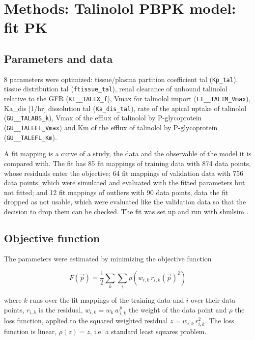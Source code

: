\section{Methods: Talinolol PBPK model: fit PK}

\subsection{Parameters and data}

8 parameters were optimized: tissue/plasma partition coefficient tal (\texttt{Kp\_tal}), tissue distribution tal (\texttt{ftissue\_tal}), renal clearance of unbound talinolol relative to the GFR (\texttt{KI\_\_TALEX\_f}), Vmax for talinolol import (\texttt{LI\_\_TALIM\_Vmax}), Ka\_dis [1/hr] dissolution tal (\texttt{Ka\_dis\_tal}), rate of the apical uptake of talinolol (\texttt{GU\_\_TALABS\_k}), Vmax of the efflux of talinolol by P-glycoprotein (\texttt{GU\_\_TALEFL\_Vmax}) and Km of the efflux of talinolol by P-glycoprotein (\texttt{GU\_\_TALEFL\_Km}).

A fit mapping is a curve of a study, the data and the observable of the model it is compared with. The fit has 85 fit mappings of training data with 874 data points, whose residuals enter the objective; 64 fit mappings of validation data with 756 data points, which were simulated and evaluated with the fitted parameters but not fitted; and 12 fit mappings of outliers with 90 data points, data the fit dropped as not usable, which were evaluated like the validation data so that the decision to drop them can be checked. The fit was set up and run with sbmlsim \cite{Koenig2026_sbmlsim}.

\subsection{Objective function}

The parameters were estimated by minimizing the objective function

\begin{equation}
F(\vec{p}) = \frac{1}{2} \sum_{k} \sum_{i} \rho\left(w_{i,k}\, r_{i,k}(\vec{p})^2\right)
\end{equation}

where $k$ runs over the fit mappings of the training data and $i$ over their data points, $r_{i,k}$ is the residual, $w_{i,k} = w_k\, w^{p}_{i,k}$ the weight of the data point and $\rho$ the loss function, applied to the squared weighted residual $z = w_{i,k}\, r_{i,k}^2$. The loss function is linear, $\rho(z) = z$, i.e. a standard least squares problem.

